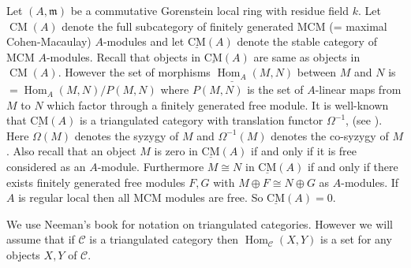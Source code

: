 \documentclass{amsart}
\newcommand{\CM}{Cohen-Macaulay}
\newcommand{\m}{\mathfrak{m} }
\newcommand{\CMS}{\operatorname{\underline{CM}}}
\newcommand{\CMa}{\operatorname{CM}}
\newcommand{\Hom}{\operatorname{Hom}}
\theoremstyle{plain}
\theoremstyle{definition}
\theoremstyle{remark}
\begin{document}
Let $(A,\m)$ be a  commutative Gorenstein local ring with residue field $k$. Let $\CMa(A)$ denote the full subcategory of finitely generated  MCM (= maximal \CM) $A$-modules  and let $\CMS(A)$ denote the stable category of MCM $A$-modules. Recall that objects in $\CMS(A)$ are same as objects in $\CMa(A)$. However the set of morphisms $\underline{\Hom_A}(M,N)$ between $M$ and $N$ is  $= \Hom_A(M,N)/P(M,N)$ where $P(M,N)$ is the set of $A$-linear maps from $M$ to $N$ which factor through a finitely generated free module. It is well-known that $\CMS(A)$ is  a triangulated category with translation functor $\Omega^{-1}$,  (see \cite{Bu}).  Here $\Omega(M)$ denotes the syzygy of $M$ and $\Omega^{-1}(M)$ denotes the co-syzygy of $M$. Also recall that an object $M$ is zero in $\CMS(A)$ if and only if it is free  considered as an $A$-module. Furthermore $M \cong N$ in $\CMS(A)$ if and only
if there exists finitely generated free modules $F,G$ with $M\oplus F \cong N \oplus G$ as $A$-modules.  If $A$ is regular local then all MCM
modules are free. So $\CMS(A) = 0$.

 We use Neeman's book \cite{N} for notation on triangulated categories. However we will assume that if $\mathcal{C}$ is a triangulated category then $\Hom_\mathcal{C}(X, Y)$ is a set for any objects $X, Y$ of $\mathcal{C}$.
\end{document}
